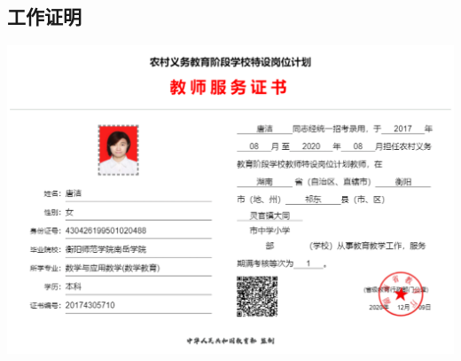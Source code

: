 \documentclass[UFT8]{ctexart}%
\begin{document}
\subsection{工作证明}
\begin{center}
 \includegraphics[scale=0.2]{figs/特岗服务证书.jpg }
\end{center}
%
\end{document}
